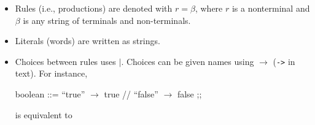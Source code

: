 
\begin{itemize}
  \item Rules (i.e., productions) are denoted with $r = \beta$, where $r$ is a nonterminal and $\beta$ is any string of terminals and non-terminals.
  \item Literals (words) are written as strings.
  \item Choices between rules uses $|.$ Choices can be given names using $\to$ (\texttt{->} in text). For instance,
  \begin{bnf}
  boolean ::= ``true'' $\to$ true // ``false'' $\to$ false ;;
\end{bnf}
  is equivalent to


\end{itemize}
